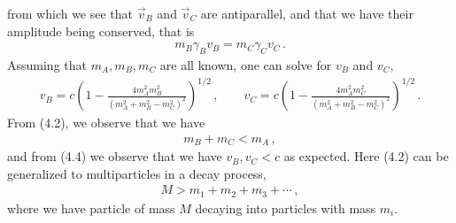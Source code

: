 \documentclass[11pt, onesided]{book}
\theoremstyle{break}
\theoremstyle{break}
\begin{document}
from which we see that $\vec{v}_B$ and $\vec{v}_C$ are antiparallel, and that we have their amplitude being conserved, that is
\begin{align}
m_B \gamma_B v_B = m_C \gamma_C v_C\,.
\end{align}
Assuming that $m_A,m_B,m_C$ are all known, one can solve for $v_B$ and $v_C$, 
\begin{align}
v_B = c\left(1-\frac{4m_A^2m_B^2}{(m_A^2 + m_B^2-m_C^2)^2} \right)^{1/2}\,,\qquad
v_C = c\left(1-\frac{4m_A^2m_C^2}{(m_A^2 + m_B^2-m_C^2)^2} \right)^{1/2}\,.
\end{align}
From (4.2), we observe that we have
\begin{align*}
m_B + m_C < m_A\,,
\end{align*}
and from (4.4) we observe that we have $v_B,v_C<c$ as expected. Here (4.2) can be generalized to multiparticles in a decay process,
\begin{align*}
M>m_1 + m_2 + m_3 + \cdots\,,
\end{align*}
where we have particle of mass $M$ decaying into particles with mass $m_i$. \\
\end{document}
